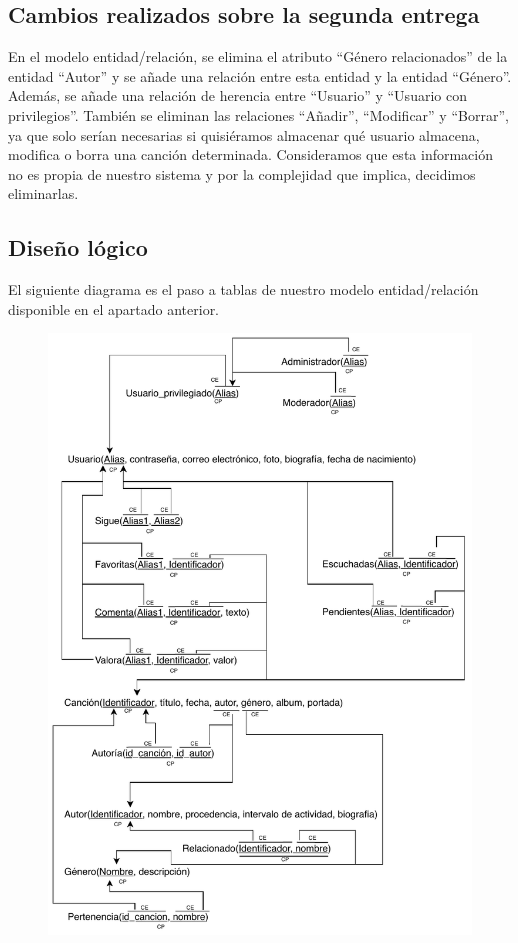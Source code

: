 \subsection{Cambios realizados sobre la segunda entrega}

En el modelo entidad/relación, se elimina el atributo ``Género relacionados'' de la entidad ``Autor'' y se añade una relación entre esta entidad y la entidad ``Género''. Además, se añade una relación de herencia entre ``Usuario'' y ``Usuario con privilegios''. También se eliminan las relaciones ``Añadir'', ``Modificar'' y ``Borrar'', ya que solo serían necesarias si quisiéramos almacenar qué usuario almacena, modifica o borra una canción determinada. Consideramos que esta información no es propia de nuestro sistema y por la complejidad que implica, decidimos eliminarlas.

\subsection{Diseño lógico}

El siguiente diagrama es el paso a tablas de nuestro modelo entidad/relación disponible en el apartado anterior.

\begin{figure}[H]
  \centering
  \includegraphics[scale=0.9]{diagramas/paso_a_tablas.pdf}
\end{figure}

